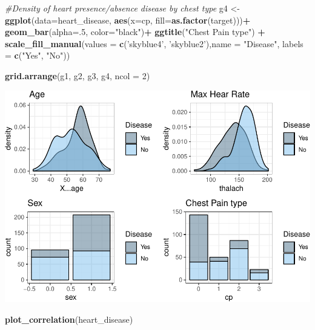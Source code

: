 \documentclass[]{article}
\newenvironment{Shaded}{\begin{snugshade}}{\end{snugshade}}
\newcommand{\KeywordTok}[1]{\textcolor[rgb]{0.13,0.29,0.53}{\textbf{#1}}}
\newcommand{\DataTypeTok}[1]{\textcolor[rgb]{0.13,0.29,0.53}{#1}}
\newcommand{\DecValTok}[1]{\textcolor[rgb]{0.00,0.00,0.81}{#1}}
\newcommand{\StringTok}[1]{\textcolor[rgb]{0.31,0.60,0.02}{#1}}
\newcommand{\CommentTok}[1]{\textcolor[rgb]{0.56,0.35,0.01}{\textit{#1}}}
\newcommand{\OperatorTok}[1]{\textcolor[rgb]{0.81,0.36,0.00}{\textbf{#1}}}
\newcommand{\NormalTok}[1]{#1}
\begin{document}
\begin{Shaded}
\begin{Highlighting}[]
\CommentTok{#Density of heart presence/absence disease by chest type}
\NormalTok{g4 <-}\StringTok{ }\KeywordTok{ggplot}\NormalTok{(}\DataTypeTok{data=}\NormalTok{heart_disease, }\KeywordTok{aes}\NormalTok{(}\DataTypeTok{x=}\NormalTok{cp, }\DataTypeTok{fill=}\KeywordTok{as.factor}\NormalTok{(target)))}\OperatorTok{+}
\StringTok{  }\KeywordTok{geom_bar}\NormalTok{(}\DataTypeTok{alpha=}\NormalTok{.}\DecValTok{5}\NormalTok{, }\DataTypeTok{color=}\StringTok{"black"}\NormalTok{)}\OperatorTok{+}
\StringTok{  }\KeywordTok{ggtitle}\NormalTok{(}\StringTok{"Chest Pain type"}\NormalTok{) }\OperatorTok{+}
\StringTok{  }\KeywordTok{scale_fill_manual}\NormalTok{(}\DataTypeTok{values =} \KeywordTok{c}\NormalTok{(}\StringTok{'skyblue4'}\NormalTok{, }\StringTok{'skyblue2'}\NormalTok{),}\DataTypeTok{name =} \StringTok{"Disease"}\NormalTok{, }\DataTypeTok{labels =} \KeywordTok{c}\NormalTok{(}\StringTok{"Yes"}\NormalTok{, }\StringTok{"No"}\NormalTok{))}

\KeywordTok{grid.arrange}\NormalTok{(g1, g2, g3, g4, }\DataTypeTok{ncol =} \DecValTok{2}\NormalTok{)}
\end{Highlighting}
\end{Shaded}

\includegraphics{project_report_files/figure-latex/unnamed-chunk-5-1.pdf}

\begin{Shaded}
\begin{Highlighting}[]
\KeywordTok{plot_correlation}\NormalTok{(heart_disease)}
\end{Highlighting}
\end{Shaded}
\end{document}
